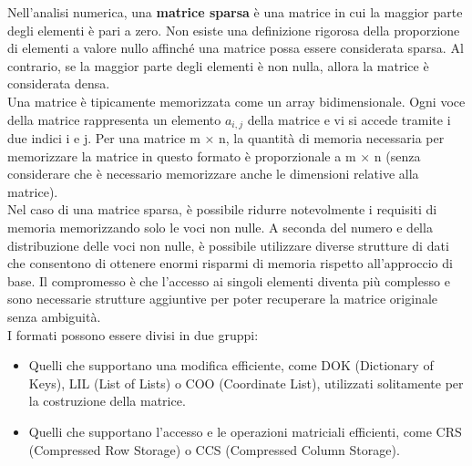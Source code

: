 Nell'analisi numerica, una \textbf{matrice sparsa} è una matrice in cui la maggior parte degli elementi è pari a zero. Non esiste una definizione rigorosa della proporzione di elementi a valore nullo affinché una matrice possa essere considerata sparsa. Al contrario, se la maggior parte degli elementi è non nulla, allora la matrice è considerata densa.
\\
Una matrice è tipicamente memorizzata come un array bidimensionale. Ogni voce della matrice rappresenta un elemento $a_{i,j}$ della matrice e vi si accede tramite i due indici i e j. Per una matrice m × n, la quantità di memoria necessaria per memorizzare la matrice in questo formato è proporzionale a m × n (senza considerare che è necessario memorizzare anche le dimensioni relative alla matrice).
\\
Nel caso di una matrice sparsa, è possibile ridurre notevolmente i requisiti di memoria memorizzando solo le voci non nulle. A seconda del numero e della distribuzione delle voci non nulle, è possibile utilizzare diverse strutture di dati che consentono di ottenere enormi risparmi di memoria rispetto all'approccio di base. Il compromesso è che l'accesso ai singoli elementi diventa più complesso e sono necessarie strutture aggiuntive per poter recuperare la matrice originale senza ambiguità.
\\
I formati possono essere divisi in due gruppi:
\begin{itemize}
	\item Quelli che supportano una modifica efficiente, come DOK (Dictionary of Keys), LIL (List of Lists) o COO (Coordinate List), utilizzati solitamente per la costruzione della matrice.
	\item Quelli che supportano l'accesso e le operazioni matriciali efficienti, come CRS (Compressed Row Storage) o CCS (Compressed Column Storage).
\end{itemize}
